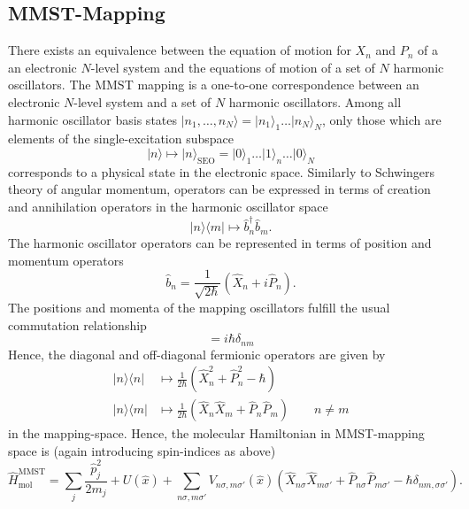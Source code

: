 \documentclass{article}
\newcommand{\pdagger}{{\phantom{\dagger}}}
\newcommand{\state}[1]{\vert #1\rangle}
\newcommand{\cstate}[1]{\langle #1\vert}
\begin{document}
\subsection{MMST-Mapping}
There exists an equivalence between the equation of motion for $X_n$ and $P_n$ of a an electronic $N$-level system and the equations of motion of a set of $N$ harmonic oscillators. 
The MMST mapping is a one-to-one correspondence between an electronic $N$-level system and a set of $N$ harmonic oscillators. Among all harmonic oscillator basis states $\state{n_1,\dots,n_N}=\state{n_1}_1\dots \state{n_N}_N$, only those which are elements of the single-excitation subspace 
\begin{equation}
	\state{n}\mapsto \state{n}_\mathrm{SEO} = \state{0}_1\dots \state{1}_n\dots \state{0}_N
\end{equation}
corresponds to a physical state in the electronic space.
Similarly to Schwingers theory of angular momentum, operators can be expressed in terms of creation and annihilation operators in the harmonic oscillator space
\begin{equation}
	\state{n}\cstate{m} \mapsto \hat{b}_n^\dagger \hat{b}_m^\pdagger.
\end{equation}
The harmonic oscillator operators can be represented in terms of position and momentum operators
\begin{equation}
	\hat{b}_n = \frac{1}{\sqrt{2\hbar}}(\hat{X}_n+i\hat{P}_n).
\end{equation}
The positions and momenta of the mapping oscillators fulfill the usual commutation relationship
\begin{equation}
	[\hat{X}_n,\hat{P}_m]=i\hbar\delta_{nm}
\end{equation}
Hence, the diagonal and off-diagonal fermionic operators are given by
\begin{align}
	\state{n}\cstate{n} &\mapsto \frac{1}{2\hbar} (\hat{X}_n^2+\hat{P}_n^2 -\hbar)\\
	 \state{n}\cstate{m} & \mapsto \frac{1}{2\hbar} (\hat{X}_n \hat{X}_m +\hat{P}_n \hat{P}_m) \qquad n\neq m
\end{align}
in the mapping-space.
Hence, the molecular Hamiltonian in MMST-mapping space is (again introducing spin-indices as above)
\begin{equation}
	\hat{H}^\mathrm{MMST}_\mathrm{mol} = \sum_j \frac{\hat{p}_j^2}{2m_j} + U(\hat{x}) + \sum_{n\sigma, m\sigma'} V_{n\sigma,m\sigma'}(\hat{x}) (\hat{X}_{n\sigma}\hat{X}_{m\sigma'}+\hat{P}_{n\sigma}\hat{P}_{m\sigma'}-\hbar\delta_{nm,\sigma\sigma'}).
\end{equation}
\end{document}
